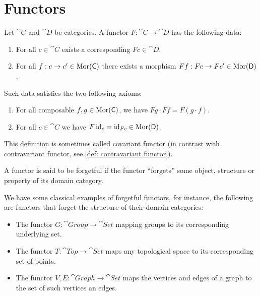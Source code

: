 \section{Functors}

\begin{definition}[Functor]\label{def: functor}
  Let \(\cat C\) and \(\cat D\) be categories. A functor \(F: \cat C \to \cat
  D\) has the following data:
  \begin{enumerate}[({DF}1)]
    \item For all \(c \in \cat C\) exists a corresponding \(F c \in \cat D\).
    \item For all \(f: c \to c' \in \operatorname{Mor}(\mathsf C)\) there exists a morphism \(F
      f: F c \to F c' \in \operatorname{Mor}(\mathsf D)\).
  \end{enumerate}
  Such data satisfies the two following axioms:
  \begin{enumerate}[({AF}1)]
    \item For all composable \(f, g \in \operatorname{Mor}(\mathsf C)\), we have \(F g \cdot F f
      = F (g \cdot f)\).
    \item For all \(c \in \cat C\) we have \(F \operatorname{id}_c = \operatorname{id}_{F c} \in \operatorname{Mor}(\mathsf
      D)\).
  \end{enumerate}
  This definition is sometimes called covariant functor (in contrast with
  contravariant functor, see \cref{def: contravariant functor}).
\end{definition}

\begin{definition}
  A functor is said to be forgetful if the functor ``forgets'' some object,
  structure or property of its domain category.
\end{definition}

\begin{example}
  We have some classical examples of forgetful functors, for instance, the
  following are functors that forget the structure of their domain categories:
  \begin{itemize}
    \item The functor \(G: \cat{Group} \to \cat{Set}\) mapping groups to its
      corresponding underlying set.
    \item The functor \(T: \cat{Top} \to \cat{Set}\) maps any topological space
      to its corresponding set of points.
    \item The functor \(V, E: \cat{Graph} \to \cat{Set}\) maps the vertices and
      edges of a graph to the set of such vertices an edges.
  \end{itemize}
\end{example}

